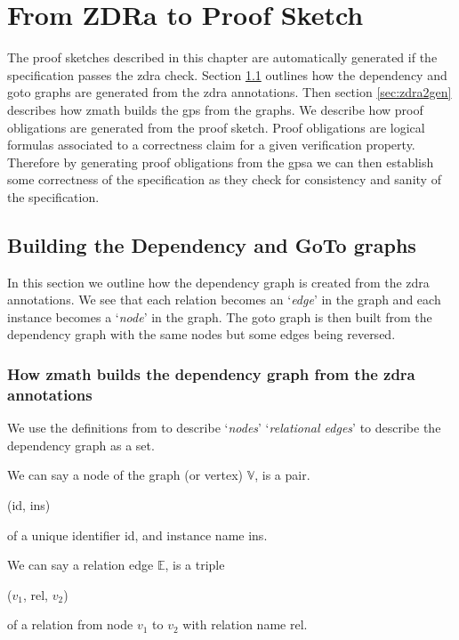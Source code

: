 \chapter{From ZDRa to Proof Sketch}
\label{ch:skeletons}

The proof sketches described in this chapter are automatically generated if the
specification passes the \gls{zdra} check. Section \ref{sec:buildinggraphs}
outlines how the dependency and goto graphs are generated from the \gls{zdra}
annotations. Then section \ref{sec:zdra2gen} describes how \gls{zmath} builds
the \gls{gps} from the graphs.  
We describe how proof obligations are generated from the  proof sketch.
Proof obligations are logical formulas associated to a correctness claim for a
given verification property. Therefore by generating proof obligations from 
the \gls{gpsa} we can then establish some correctness of the specification as
they check for consistency and sanity of the specification.


\section{Building the Dependency and GoTo graphs}
\label{sec:buildinggraphs}

In this section we outline how the dependency graph is created from the
\gls{zdra} annotations. We see that each relation becomes an `\emph{edge}' in
the graph and each instance becomes a `\emph{node}' in the graph. The goto graph
is then built from the dependency graph with the same nodes but some edges being
reversed.

\subsection{How \gls{zmath} builds the dependency graph from the \gls{zdra} annotations}

We use the definitions from \cite{zengfirstyear} to describe `\emph{nodes}'
`\emph{relational edges}' to describe the dependency graph as a set.

\begin{defin} We can say a node of the graph (or vertex) $\mathbb{V}$, is
a pair.
\begin{center}
(id, ins)
\end{center}
of a unique identifier id, and instance name ins. 
\end{defin} 

\begin{defin} We can say a relation edge $\mathbb{E}$, is a
triple
\begin{center}
($v_{1}$, rel, $v_{2}$)
\end{center}
of a relation from node $v_{1}$ to $v_{2}$ with relation name rel.
\end{defin} 

